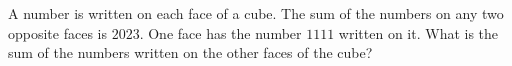 A number is written on each face of a cube. The sum of the numbers on any two opposite faces is $2023$. One face has the number $1111$ written on it. What is the sum of the numbers written on the other faces of the cube?
